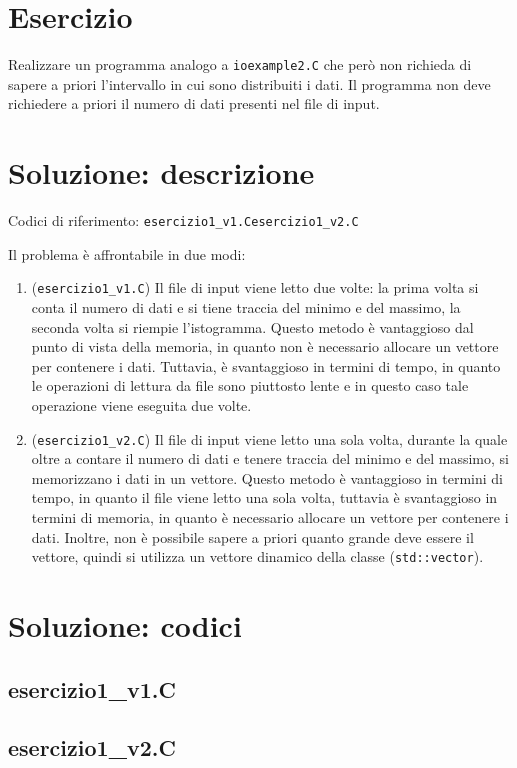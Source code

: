 \documentclass[10pt]{article}
\newcommand{\ttt}{\texttt}
\begin{document}
\newpage

\section{Esercizio}

Realizzare un programma analogo a \ttt{ioexample2.C} che però non richieda di sapere a priori l'intervallo in cui sono distribuiti i dati.
Il programma non deve richiedere a priori il numero di dati presenti nel file di input.

\section{Soluzione: descrizione}
Codici di riferimento: \ttt{esercizio1\_v1.C}\hspace{10pt}\ttt{esercizio1\_v2.C} \vspace{10pt}

Il problema è affrontabile in due modi:
\begin{enumerate}
    \item (\ttt{esercizio1\_v1.C}) Il file di input viene letto due volte: la prima volta si conta il numero di dati e si tiene traccia del minimo e del massimo, la seconda volta si riempie l'istogramma.
        Questo metodo è vantaggioso dal punto di vista della memoria, in quanto non è necessario allocare un vettore per contenere i dati.
        Tuttavia, è svantaggioso in termini di tempo, in quanto le operazioni di lettura da file sono piuttosto lente e in questo caso tale operazione viene eseguita due volte.
    \item (\ttt{esercizio1\_v2.C}) Il file di input viene letto una sola volta, durante la quale oltre a contare il numero di dati e tenere traccia del minimo e del massimo, si memorizzano i dati in un vettore.
        Questo metodo è vantaggioso in termini di tempo, in quanto il file viene letto una sola volta, tuttavia è svantaggioso in termini di memoria, in quanto è necessario allocare un vettore per contenere i dati.
        Inoltre, non è possibile sapere a priori quanto grande deve essere il vettore, quindi si utilizza un vettore dinamico della classe (\ttt{std::vector}).
\end{enumerate}


\newpage
\section{Soluzione: codici}

\subsection{esercizio1\_v1.C}


\newpage

\subsection{esercizio1\_v2.C}

\end{document}
